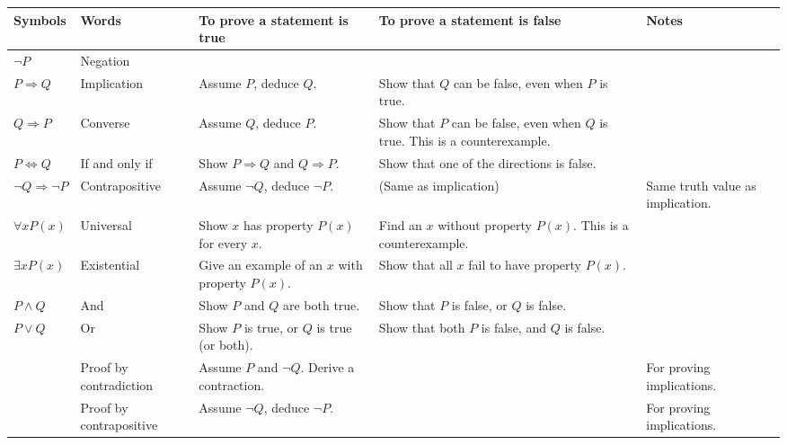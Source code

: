 \documentclass[11pt]{article}
\theoremstyle{definition}
\numberwithin{thm}{section}
\begin{document}
\begin{table}[ht]\label{table:logic}
\begin{tabular}{p{2cm}|p{2.5cm}|p{3cm}|p{3cm}|p{2.2cm}}
\textbf{Symbols}            & \textbf{Words}          & \textbf{To prove a statement is true}           & \textbf{To prove a statement is false}             & \textbf{Notes}                   \\\hline
$\neg P$                    & Negation                &                                                 &                                                    &                                  \\\hline
$P \Rightarrow Q$           & Implication             & Assume $P$, deduce $Q$.                         & Show that $Q$ can be false, even when $P$ is true. &                                  \\\hline
$Q \Rightarrow P$           & Converse                & Assume $Q$, deduce $P$.                         & Show that $P$ can be false, even when $Q$ is true. This is a counterexample. &                                  \\\hline
$P \Leftrightarrow Q$       & If and only if          & Show $P \Rightarrow Q$ and $Q \Rightarrow P$.   & Show that one of the directions is false.          &                                  \\\hline
$\neg Q \Rightarrow \neg P$ & Contrapositive          & Assume $\neg Q$, deduce $\neg P$.               & (Same as implication)                              & Same truth value as implication. \\\hline
$\forall x P(x)$            & Universal               & Show $x$ has property $P(x)$ for every $x$.     & Find an $x$ without property $P(x)$. This is a counterexample.               &                                  \\\hline
$\exists x P(x)$            & Existential             & Give an example of an $x$ with property $P(x)$. & Show that all $x$ fail to have property $P(x)$.    &                                  \\\hline
$P \wedge Q$                  & And                     & Show $P$ and $Q$ are both true.                 & Show that $P$ is false, or $Q$ is false.           &                                  \\\hline
$P \vee Q$                  & Or                      & Show $P$ is true, or $Q$ is true (or both).     & Show that both $P$ is false, and $Q$ is false.     &                                  \\\hline
                            & Proof by contradiction  & Assume $P$ and $\neg Q$. Derive a contraction.  &                                                    & For proving implications.        \\\hline
                            & Proof by contrapositive & Assume $\neg Q$, deduce $\neg P$.               &                                                    & For proving implications.       
\end{tabular}
\end{table}
\end{document}
